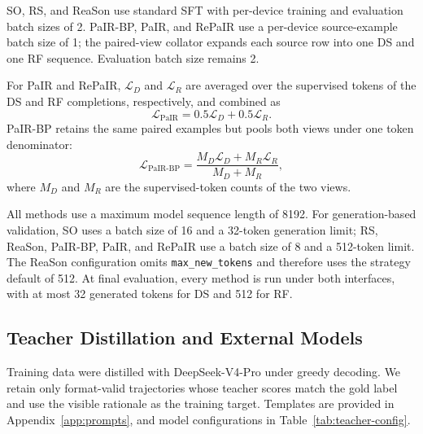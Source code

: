 SO, RS, and ReaSon use standard SFT with per-device training and evaluation
batch sizes of 2. PaIR-BP, PaIR, and RePaIR use a per-device source-example
batch size of 1; the paired-view collator expands each source row into one DS
and one RF sequence. Evaluation batch size remains 2.

For PaIR and RePaIR, \(\mathcal{L}_D\) and \(\mathcal{L}_R\) are averaged
over the supervised tokens of the DS and RF completions, respectively, and
combined as
\[
\mathcal{L}_{\mathrm{PaIR}}
=0.5\mathcal{L}_D+0.5\mathcal{L}_R.
\]
PaIR-BP retains the same paired examples but pools both views under one token
denominator:
\[
\mathcal{L}_{\mathrm{PaIR\text{-}BP}}
=\frac{M_D\mathcal{L}_D+M_R\mathcal{L}_R}{M_D+M_R},
\]
where \(M_D\) and \(M_R\) are the supervised-token counts of the two views.

All methods use a maximum model sequence length of 8192. For generation-based
validation, SO uses a batch size of 16 and a 32-token generation limit; RS,
ReaSon, PaIR-BP, PaIR, and RePaIR use a batch size of 8 and a 512-token limit.
The ReaSon configuration omits \texttt{max\_new\_tokens} and therefore uses the
strategy default of 512. At final evaluation, every method is run under both
interfaces, with at most 32 generated tokens for DS and 512 for RF.

\subsection{Teacher Distillation and External Models}
\label{app:teacher-distillation}

Training data were distilled with DeepSeek-V4-Pro under greedy decoding. We
retain only format-valid trajectories whose teacher scores match the gold label
and use the visible rationale as the training target. Templates are provided in
Appendix~\ref{app:prompts}, and model configurations in
Table~\ref{tab:teacher-config}.

